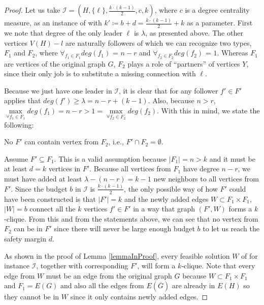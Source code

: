 \begin{proof}
    Let us take $\mathcal{I} = (H, \{\ell\}, \frac{k\cdot(k-1)}{2}, c, k)$, where $c$ is a degree centrality measure,
    as an instance of \HLdeg with $k' \coloneqq b + d = \frac{k\cdot(k-1)}{2} + k$ as a parameter.
    First we note that degree of the only leader $\ell$ is $\lambda$, as presented above.
    The other vertices $V(H) - l$ are naturally followers of which we can recognize two types, $F_1$ and $F_2$,
    where $\forall_{f_1 \in F_1} deg(f_1)$ = $n-r$ and $\forall_{f_2 \in F_2} deg(f_2)$ = $1$.
    Whereas $F_1$ are vertices of the original graph $G$,
    $F_2$ plays a role of ``partners'' of vertices $Y$, since their only job is to substitute a missing connection with $\ell$.

    Because we just have one leader in $\mathcal{I}$, it is clear that for any follower $f' \in F'$ applies that
    $deg(f') \geq \lambda = n - r + (k - 1)$.
    Also, because $n > r$, $\max\limits_{\forall f_1 \in F_1}deg(f_1) = n-r > 1 = \max\limits_{\forall f_2 \in F_2}deg(f_2)$.
    With this in mind, we state the following:

    \begin{lemma}\label{lemmaInProof}
        No $F'$ can contain vertex from $F_2$, i.e., $F' \cap F_2 = \emptyset$.
    \end{lemma}
    \begin{subproof}
        Assume $F' \subseteq F_1$. This is a valid assumption because $|F_1| = n > k$ and it must be at least $d = k$ vertices in $F'$.
        Because all vertices from $F_1$ have degree $n-r$, we must have added at least $\lambda - (n - r) = k - 1$ new neighbors to all vertices from $F'$.
        Since the budget $b$ in $\mathcal{I}$ is $\frac{k\cdot(k-1)}{2}$,
        the only possible way of how $F'$ could have been constructed is that $|F'|=k$ and the newly added edges $W \subset F_1 \times F_1$, $|W| = b$
        connect all the $k$ vertices $f' \in F'$ in a way that graph $(F', W)$ forms a $k$-clique.
        From this and from the statements above, we can see that no vertex from $F_2$ can be in $F'$
        since there will never be large enough budget $b$ to let us reach the safety margin $d$.
    \end{subproof}

    As shown in the proof of Lemma \ref{lemmaInProof}, every feasible solution $W$ of \HLshort for instance $\mathcal{I}$, together with corresponding $F'$,
    will form a $k$-clique.
    Note that every edge from $W$ must be an edge from the original graph $G$ because $W \subset F_1 \times F_1$ and $F_1 = E(G)$
    and also all the edges from $E(\overline{G})$ are already in $E(H)$ so they cannot be in $W$ since it only contains newly added edges.


\end{proof}
